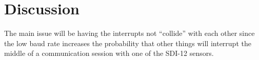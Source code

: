 \section{Discussion}


The main issue will be having the interrupts not “collide” with each other since the low baud rate increases the probability that other things will interrupt the middle of a communication session with one of the SDI-12 sensors.